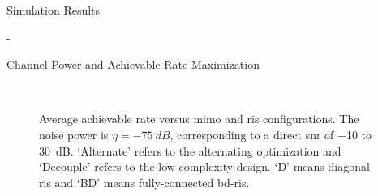\begin{section}{Simulation Results}
\begin{subsection}{-}
\begin{subsubsection}{Channel Power and Achievable Rate Maximization}
			\begin{figure}[H]
				\centering
				\\
				\caption{
					Average achievable rate versus \gls{mimo} and \gls{ris} configurations.
					The noise power is $\eta = \qty{-75}{dB}$, corresponding to a direct \gls{snr} of \num{-10} to \qty{30}{dB}.
					`Alternate' refers to the alternating optimization and `Decouple' refers to the low-complexity design.
					`D' means diagonal \gls{ris} and `BD' means fully-connected \gls{bd}-\gls{ris}.
				}
				\label{fg:rate}
			\end{figure}


\end{subsubsection}
\end{subsection}
\end{section}

